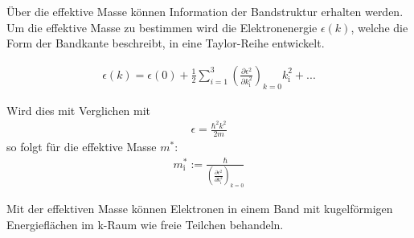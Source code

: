 Über die effektive Masse können Information der Bandstruktur erhalten werden.
Um die effektive Masse zu bestimmen wird die Elektronenergie $\epsilon (k)$,
welche die Form der Bandkante beschreibt, in eine Taylor-Reihe entwickelt.

\begin{align}
  \epsilon(k) = \epsilon (0) + \frac{1}{2} \sum_{i=1}^3 \left(\frac{\partial \epsilon^2}{\partial k^2_{\mathrm{i}}}\right)_{k=0} k_{\mathrm{i}}^2 + ...
\end{align}

Wird dies mit Verglichen mit
\begin{align}
  \epsilon = \frac{\hbar^2 k^2}{2m}
\end{align}
so folgt für die effektive Masse $m^*$:
\begin{align}
  m^*_{\mathrm{i}} := \frac{\hbar}{\left(\frac{\partial \epsilon^2}{\partial k^2_{\mathrm{i}}}\right)_{k=0}}
\end{align}

Mit der effektiven Masse können Elektronen in einem Band mit kugelförmigen
Energieflächen im k-Raum wie freie Teilchen behandeln.
